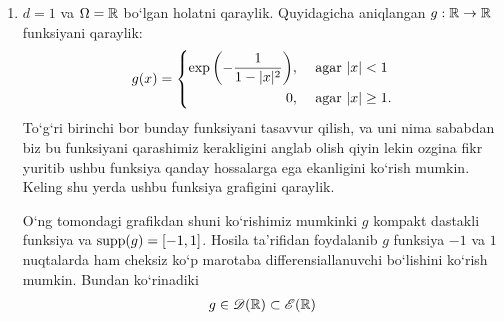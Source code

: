 \begin{example}
    \begin{enumerate}
        \item $d=1$ va $\Omega=\mathbb{R}$ bo`lgan holatni qaraylik. Quyidagicha aniqlangan $g:\mathbb{R}\rightarrow \mathbb{R}$ funksiyani qaraylik:
    \begin{equation}
            g(x)=\left\{\begin{aligned}
                \exp\left(-\frac{1}{1-\lvert x\rvert^2}\right)&, & \textnormal{ agar } & \lvert x\rvert <1 \\
                 0 &, & \textnormal{ agar } & \lvert x\rvert \ge 1.
            \end{aligned}\right. 
    \end{equation}
    To`g`ri birinchi bor bunday funksiyani tasavvur qilish, va uni nima sa\-bab\-dan biz bu funksiyani qarashimiz kerakligini anglab olish qiyin lekin ozgina fikr yu\-ri\-tib ushbu funksiya qanday hossalarga ega ekanligini ko`rish mumkin. Keling shu yer\-da ushbu funksiya grafigini qaraylik. \par
    \noindent 
    \begin{minipage}{0.89\textwidth}
    \begin{minipage}[b]{0.5\textwidth}
    O`ng tomondagi grafikdan shuni ko`\-ri\-shi\-miz mumkinki $g$ kom\-pakt das\-tak\-li funksiya va $\operatorname{supp}(g)=[-1,1]$. Hosila ta'rifidan foydalanib $g$ funk\-si\-ya $-1$ va $1$ nuq\-ta\-lar\-da ham cheksiz ko`p ma\-ro\-ta\-ba dif\-fe\-ren\-si\-al\-la\-nuv\-chi bo`\-li\-shi\-ni ko`rish mumkin. Bundan ko`rinadiki 
    \begin{align*} 
        g\in \mathscr{D}(\mathbb{R})\subset\mathscr{E}(\mathbb{R})
    \end{align*}
    \end{minipage}
    \hspace{0.02\textwidth}
    \begin{minipage}[b]{0.45\textwidth}
        \begin{figure}[H]
            \centering
            \label{fig:convkernel}
        

\end{figure}
\end{minipage}
\end{minipage}
\end{enumerate}
\end{example}
